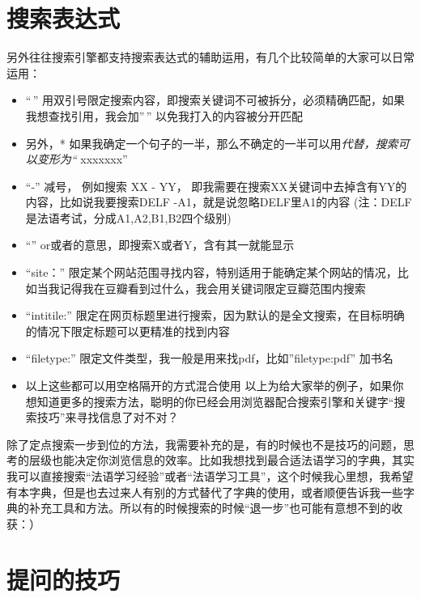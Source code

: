 \documentclass[
]{book}
\begin{document}
\hypertarget{ux641cux7d22ux8868ux8fbeux5f0f}{%
\section{搜索表达式}\label{ux641cux7d22ux8868ux8fbeux5f0f}}

另外往往搜索引擎都支持搜索表达式的辅助运用，有几个比较简单的大家可以日常运用：

\begin{itemize}
\item
  ``\,'' 用双引号限定搜索内容，即搜索关键词不可被拆分，必须精确匹配，如果我想查找引用，我会加''\,'' 以免我打入的内容被分开匹配
\item
  另外，* 如果我确定一个句子的一半，那么不确定的一半可以用\emph{代替，搜索可以变形为`` } xxxxxxx''
\item
  ``-'' 减号， 例如搜索 XX - YY， 即我需要在搜索XX关键词中去掉含有YY的内容，比如说我要搜索DELF -A1，就是说忽略DELF里A1的内容 (注：DELF是法语考试，分成A1,A2,B1,B2四个级别)
\item
  ``\textbar{}'' or或者的意思，即搜索X或者Y，含有其一就能显示
\item
  ``site：'' 限定某个网站范围寻找内容，特别适用于能确定某个网站的情况，比如当我记得我在豆瓣看到过什么，我会用关键词限定豆瓣范围内搜索
\item
  ``intitile:'' 限定在网页标题里进行搜索，因为默认的是全文搜索，在目标明确的情况下限定标题可以更精准的找到内容
\item
  ``filetype:'' 限定文件类型，我一般是用来找pdf，比如''filetype:pdf'' 加书名
\item
  以上这些都可以用空格隔开的方式混合使用
  以上为给大家举的例子，如果你想知道更多的搜索方法，聪明的你已经会用浏览器配合搜索引擎和关键字``搜索技巧''来寻找信息了对不对？
\end{itemize}

除了定点搜索一步到位的方法，我需要补充的是，有的时候也不是技巧的问题，思考的层级也能决定你浏览信息的效率。比如我想找到最合适法语学习的字典，其实我可以直接搜索``法语学习经验''或者``法语学习工具''，这个时候我心里想，我希望有本字典，但是也去过来人有别的方式替代了字典的使用，或者顺便告诉我一些字典的补充工具和方法。所以有的时候搜索的时候``退一步''也可能有意想不到的收获：）

\hypertarget{ux63d0ux95eeux7684ux6280ux5de7}{%
\section{提问的技巧}\label{ux63d0ux95eeux7684ux6280ux5de7}}
\end{document}
